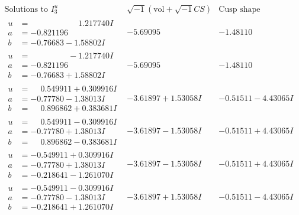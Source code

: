 \documentclass[1p]{elsarticle_modified}
\theoremstyle{definition}
\newcommand{\I}{\sqrt{-1}}
\begin{document}
$$\begin{array}{c|c|c}  
\text{Solutions to }I^u_{3}& \I (\text{vol} + \sqrt{-1}CS) & \text{Cusp shape}\\
 \hline 
\begin{aligned}
u &= \phantom{-0.000000 -}1.217740 I \\
a &= -0.821196\phantom{ +0.000000I} \\
b &= -0.76683 - 1.58802 I\end{aligned}
 & -5.69095\phantom{ +0.000000I} & -1.48110\phantom{ +0.000000I} \\ \hline\begin{aligned}
u &= \phantom{-0.000000 } -1.217740 I \\
a &= -0.821196\phantom{ +0.000000I} \\
b &= -0.76683 + 1.58802 I\end{aligned}
 & -5.69095\phantom{ +0.000000I} & -1.48110\phantom{ +0.000000I} \\ \hline\begin{aligned}
u &= \phantom{-}0.549911 + 0.309916 I \\
a &= -0.77780 - 1.38013 I \\
b &= \phantom{-}0.896862 + 0.383681 I\end{aligned}
 & -3.61897 + 1.53058 I & -0.51511 - 4.43065 I \\ \hline\begin{aligned}
u &= \phantom{-}0.549911 - 0.309916 I \\
a &= -0.77780 + 1.38013 I \\
b &= \phantom{-}0.896862 - 0.383681 I\end{aligned}
 & -3.61897 - 1.53058 I & -0.51511 + 4.43065 I \\ \hline\begin{aligned}
u &= -0.549911 + 0.309916 I \\
a &= -0.77780 + 1.38013 I \\
b &= -0.218641 - 1.261070 I\end{aligned}
 & -3.61897 - 1.53058 I & -0.51511 + 4.43065 I \\ \hline\begin{aligned}
u &= -0.549911 - 0.309916 I \\
a &= -0.77780 - 1.38013 I \\
b &= -0.218641 + 1.261070 I\end{aligned}
 & -3.61897 + 1.53058 I & -0.51511 - 4.43065 I \\ \hline\begin{aligned}

\end{aligned}
\end{array}$$
\end{document}
